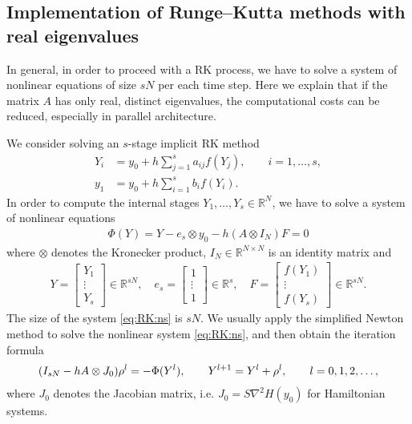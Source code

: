 \documentclass[final,leqno,onefignum,onetabnum]{siamltex1213}
\DeclarePairedDelimiter\paren{\lparen}{\rparen}
\begin{document}
\subsection{Implementation of Runge--Kutta methods with real eigenvalues}
In general, in order to proceed with a RK process,
we have to solve a system of nonlinear equations of size $sN$ per each time step.
Here we explain that
if the matrix $A$ has only real, distinct eigenvalues, the computational costs
can be reduced, especially in parallel architecture.

We consider solving an $s$-stage implicit RK method
\begin{align*}
Y_i &= y_0 + h\sum_{j=1}^s a_{ij} f(Y_j),\qquad i=1,\dots,s, \\
y_1 &= y_0 + h\sum_{i=1}^s b_i f(Y_i).
\end{align*}
In order to compute the internal stages $Y_1,\dots,Y_s \in \mathbb{R}^N$,
we have to solve a system of nonlinear equations
\begin{align}\label{eq:RK:ns}
\Phi (Y) = Y- e_s \otimes y_0 - h (A\otimes I_N) F  = 0 
\end{align}
where $\otimes$ denotes the Kronecker product,
$I_N\in {\mathbb R}^{N\times N}$ is an identity matrix and
\begin{align}
Y = \begin{bmatrix}
Y_1\\ \vdots \\ Y_s
\end{bmatrix} \in {\mathbb R}^{sN}, \quad
e_s =\begin{bmatrix}
1\\ \vdots \\ 1
\end{bmatrix} \in {\mathbb R}^s, \quad
F = \begin{bmatrix}
f(Y_1) \\ \vdots \\ f(Y_s)
\end{bmatrix} \in {\mathbb R}^{sN}.
\end{align}
The size of the system \eqref{eq:RK:ns} is $sN$.
We usually apply the simplified Newton method to solve the nonlinear system \eqref{eq:RK:ns},
and then obtain the iteration formula
\begin{align}\label{sNewton}
\paren*{I_{sN} - h A \otimes J_0 } \rho^l = - \Phi (Y^l), \qquad
Y^{l+1} = Y^l + \rho^l , \qquad l =0,1,2,\dots ,
\end{align}
where $J_0$ denotes the Jacobian matrix, i.e. $J_0 = S \nabla ^2 H(y_0)$ for Hamiltonian systems.
\end{document}
